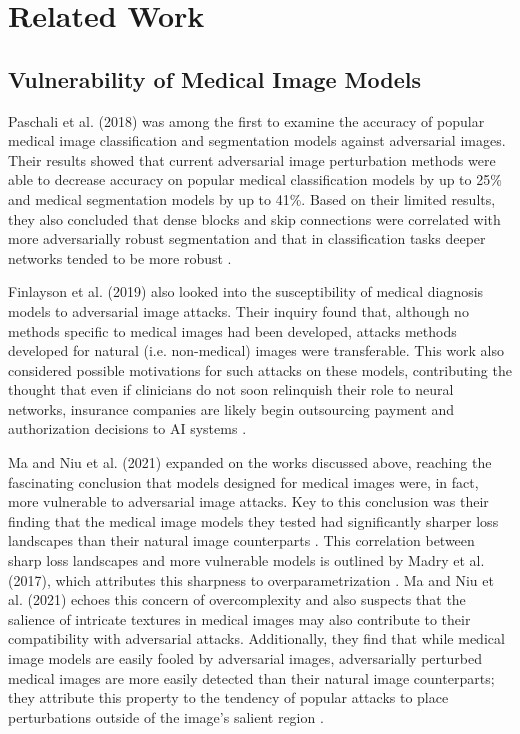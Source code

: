 \documentclass[10pt,twocolumn,letterpaper]{article}
\begin{document}
\section{Related Work}
  \subsection{Vulnerability of Medical Image Models}
    Paschali et al. (2018) was among the first to examine the accuracy of popular medical image classification and segmentation models against adversarial images. Their results showed that current adversarial image perturbation methods were able to decrease accuracy on popular medical classification models by up to 25\% and medical segmentation models by up to 41\%. Based on their limited results, they also concluded that dense blocks and skip connections were correlated with more adversarially robust segmentation and that in classification tasks deeper networks tended to be more robust \cite{Paschali}.

    Finlayson et al. (2019) also looked into the susceptibility of medical diagnosis models to adversarial image attacks. Their inquiry found that, although no methods specific to medical images had been developed, attacks methods developed for natural (i.e. non-medical) images were transferable. This work also considered possible motivations for such attacks on these models, contributing the thought that even if clinicians do not soon relinquish their role to neural networks, insurance companies are likely begin outsourcing payment and authorization decisions to AI systems \cite{Finlayson}.

    Ma and Niu et al. (2021) expanded on the works discussed above, reaching the fascinating conclusion that models designed for medical images were, in fact, more vulnerable to adversarial image attacks. Key to this conclusion was their finding that the medical image models they tested had significantly sharper loss landscapes than their natural image counterparts \cite{MaNiu}. This correlation between sharp loss landscapes and more vulnerable models is outlined by Madry et al. (2017), which attributes this sharpness to overparametrization \cite{Madry}. Ma and Niu et al. (2021) echoes this concern of overcomplexity and also suspects that the salience of intricate textures in medical images may also contribute to their compatibility with adversarial attacks. Additionally, they find that while medical image models are easily fooled by adversarial images, adversarially perturbed medical images are more easily detected than their natural image counterparts; they attribute this property to the tendency of popular attacks to place perturbations outside of the image's salient region \cite{MaNiu}.
\end{document}
